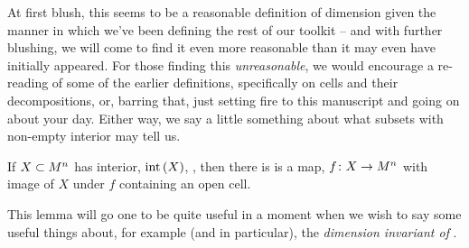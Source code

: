 At first blush, this seems to be a reasonable definition of dimension given the manner in which we've been defining the rest of our toolkit -- and with further blushing, we will come to find it even more reasonable than it may even have initially appeared. For those finding this \emph{unreasonable}, we would encourage a re-reading of some of the earlier definitions, specifically on cells and their decompositions, or, barring that, just setting fire to this manuscript and going on about your day. Either way, we say a little something about what subsets with non-empty interior may tell us.

\begin{lemma}
  \label{lemma:interior-open-cell}
  If $\XsubsetMn[n]$ has interior, $\inter{X}$, \inhb, then there is is a  \inj map, $\funcdom{f}{X}{M^n}$ with image of $X$ under $f$ containing an open cell.
\end{lemma}
This lemma will go one to be quite useful in a moment when we wish to say some useful things about, for example (and in particular), the \emph{dimension invariant of  \bijtions }.

